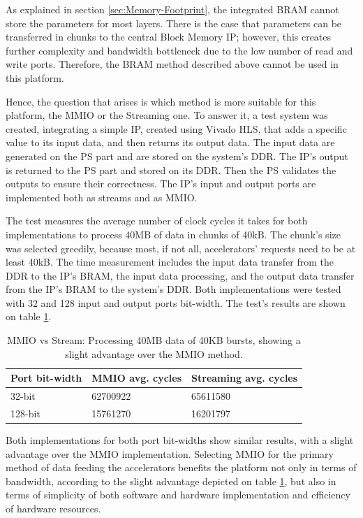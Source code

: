 As explained in section \ref{sec:Memory-Footprint}, the integrated BRAM cannot store the parameters for most layers. There is the case that parameters can be transferred in chunks to the central Block Memory IP; however, this creates further complexity and bandwidth bottleneck due to the low number of read and write ports. Therefore, the BRAM method described above cannot be used in this platform.

Hence, the question that arises is which method is more suitable for this platform, the MMIO or the Streaming one. To answer it, a test system was created, integrating a simple IP, created using Vivado HLS, that adds a specific value to its input data, and then returns its output data. The input data are generated on the PS part and are stored on the system's DDR. The IP's output is returned to the PS part and stored on its DDR. Then the PS validates the outputs to ensure their correctness. The IP's input and output ports are implemented both as streams and as MMIO.

The test measures the average number of clock cycles it takes for both implementations to process 40MB of data in chunks of 40kB. The chunk's size was selected greedily, because most, if not all, accelerators' requests need to be at least 40kB. The time measurement includes the input data transfer from the DDR to the IP's BRAM, the input data processing, and the output data transfer from the IP's BRAM to the system's DDR. Both implementations were tested with 32 and 128 input and output ports bit-width. The test's results are shown on table \ref{tab:MMIO-vs-Stream}.

\begin{table}[H]
	\caption[MMIO vs Stream]{MMIO vs Stream: Processing 40MB data of 40KB bursts, showing a slight advantage over the MMIO method.}
	\label{tab:MMIO-vs-Stream}
	\centering
	\begin{tabular}{lll}
		\toprule
		\textbf{Port bit-width} & \textbf{MMIO avg. cycles} & \textbf{Streaming avg. cycles}\\
		\midrule
			32-bit 	& 62700922 & 65611580\\
			128-bit & 15761270 & 16201797\\
		\bottomrule
	\end{tabular}
\end{table}

Both implementations for both port bit-widths show similar results, with a slight advantage over the MMIO implementation. Selecting MMIO for the primary method of data feeding the accelerators benefits the platform not only in terms of bandwidth, according to the slight advantage depicted on table \ref{tab:MMIO-vs-Stream}, but also in terms of simplicity of both software and hardware implementation and efficiency of hardware resources.


